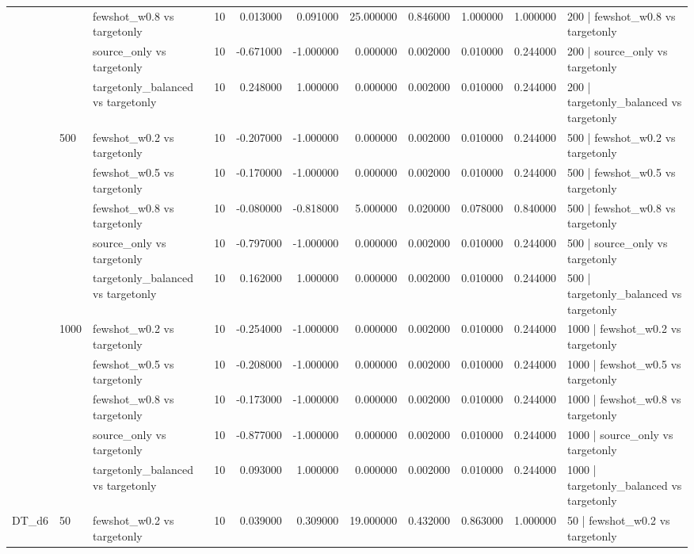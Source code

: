 \begin{tabular}{lllrrrrrrrl}
 &  & fewshot_w0.8 vs targetonly & 10 & 0.013000 & 0.091000 & 25.000000 & 0.846000 & 1.000000 & 1.000000 & 200 | fewshot_w0.8 vs targetonly \\
 &  & source_only vs targetonly & 10 & -0.671000 & -1.000000 & 0.000000 & 0.002000 & 0.010000 & 0.244000 & 200 | source_only vs targetonly \\
 &  & targetonly_balanced vs targetonly & 10 & 0.248000 & 1.000000 & 0.000000 & 0.002000 & 0.010000 & 0.244000 & 200 | targetonly_balanced vs targetonly \\
\cline{2-11}
 & \multirow[t]{5}{*}{500} & fewshot_w0.2 vs targetonly & 10 & -0.207000 & -1.000000 & 0.000000 & 0.002000 & 0.010000 & 0.244000 & 500 | fewshot_w0.2 vs targetonly \\
 &  & fewshot_w0.5 vs targetonly & 10 & -0.170000 & -1.000000 & 0.000000 & 0.002000 & 0.010000 & 0.244000 & 500 | fewshot_w0.5 vs targetonly \\
 &  & fewshot_w0.8 vs targetonly & 10 & -0.080000 & -0.818000 & 5.000000 & 0.020000 & 0.078000 & 0.840000 & 500 | fewshot_w0.8 vs targetonly \\
 &  & source_only vs targetonly & 10 & -0.797000 & -1.000000 & 0.000000 & 0.002000 & 0.010000 & 0.244000 & 500 | source_only vs targetonly \\
 &  & targetonly_balanced vs targetonly & 10 & 0.162000 & 1.000000 & 0.000000 & 0.002000 & 0.010000 & 0.244000 & 500 | targetonly_balanced vs targetonly \\
\cline{2-11}
 & \multirow[t]{5}{*}{1000} & fewshot_w0.2 vs targetonly & 10 & -0.254000 & -1.000000 & 0.000000 & 0.002000 & 0.010000 & 0.244000 & 1000 | fewshot_w0.2 vs targetonly \\
 &  & fewshot_w0.5 vs targetonly & 10 & -0.208000 & -1.000000 & 0.000000 & 0.002000 & 0.010000 & 0.244000 & 1000 | fewshot_w0.5 vs targetonly \\
 &  & fewshot_w0.8 vs targetonly & 10 & -0.173000 & -1.000000 & 0.000000 & 0.002000 & 0.010000 & 0.244000 & 1000 | fewshot_w0.8 vs targetonly \\
 &  & source_only vs targetonly & 10 & -0.877000 & -1.000000 & 0.000000 & 0.002000 & 0.010000 & 0.244000 & 1000 | source_only vs targetonly \\
 &  & targetonly_balanced vs targetonly & 10 & 0.093000 & 1.000000 & 0.000000 & 0.002000 & 0.010000 & 0.244000 & 1000 | targetonly_balanced vs targetonly \\
\cline{1-11} \cline{2-11}
\multirow[t]{25}{*}{DT_d6} & \multirow[t]{5}{*}{50} & fewshot_w0.2 vs targetonly & 10 & 0.039000 & 0.309000 & 19.000000 & 0.432000 & 0.863000 & 1.000000 & 50 | fewshot_w0.2 vs targetonly \\

\end{tabular}
